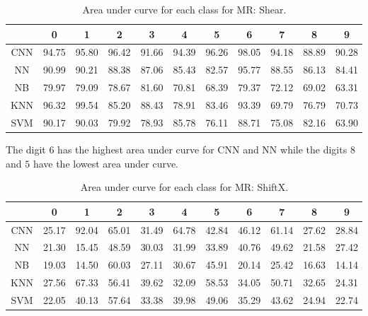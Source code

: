     \begin{table}[H]
    \centering
    \begin{tabular}{|c|c|c|c|c|c|c|c|c|c|c|}
    \hline
    & 0 & 1 & 2 & 3 & 4 & 5 & 6 & 7 & 8 & 9 \\
    \hline
    CNN & 94.75 & 95.80 & 96.42 & 91.66 & 94.39 & 96.26 &\cellcolor{green!25}98.05 & 94.18 & \cellcolor{red!25}88.89 & 90.28  \\ 
    \hline
    NN & 90.99 & 90.21 & 88.38 & 87.06 & 85.43 & \cellcolor{red!25}82.57 & \cellcolor{green!25}95.77 & 88.55 & 86.13 & 84.41 \\
    \hline
    NB & 79.97 & 79.09 & 78.67 & \cellcolor{green!25}81.60 & 70.81 & 68.39 & 79.37 & 72.12 & 69.02 & \cellcolor{red!25}63.31 \\
    \hline
    KNN & 96.32 & \cellcolor{green!25}99.54 & 85.20 & 88.43 & 78.91 & 83.46 & 93.39 & \cellcolor{red!25}69.79 & 76.79 & 70.73 \\
    \hline
    SVM & \cellcolor{green!25}90.17 & 90.03 & 79.92 & 78.93 & 85.78 & 76.11 & 88.71 & 75.08 & 82.16 & \cellcolor{red!25}63.90 \\
    \hline
    \end{tabular}
    \caption{Area under curve for each class for MR: Shear.}
    \label{tbl:test-file-formatShear}
    \end{table}
    The digit $6$ has the highest area under curve for CNN and NN while the digits $8$ and $5$ have the lowest area under curve.
    
    \begin{table}[htb!]
    \centering
    \begin{tabular}{|c|c|c|c|c|c|c|c|c|c|c|}
    \hline
    & 0 & 1 & 2 & 3 & 4 & 5 & 6 & 7 & 8 & 9 \\
    \hline
    CNN & \cellcolor{red!25}25.17 & \cellcolor{green!25}92.04 & 65.01 & 31.49 & 64.78 & 42.84 & 46.12 & 61.14 & 27.62 & 28.84 \\
    \hline
    NN & 21.30 & \cellcolor{red!25}15.45 & 48.59 & 30.03 & 31.99 & 33.89 & 40.76 & \cellcolor{green!25}49.62 & 21.58 & 27.42 \\
    \hline
    NB & 19.03 & 14.50 & \cellcolor{green!25}60.03 & 27.11 & 30.67 & 45.91 & 20.14 & 25.42 & 16.63 & \cellcolor{red!25}14.14 \\
    \hline
    KNN & 27.56 & \cellcolor{green!25}67.33 & 56.41 & 39.62 & 32.09 & 58.53 & 34.05 & 50.71 & 32.65 & \cellcolor{red!25}24.31 \\
    \hline
    SVM & \cellcolor{red!25}22.05 & 40.13 & \cellcolor{green!25}57.64 & 33.38 & 39.98 & 49.06 & 35.29 & 43.62 & 24.94 & 22.74 \\
    \hline
    \end{tabular}
    \caption{Area under curve for each class for MR: ShiftX.}
    \label{tbl:test-file-formatShiftX}
    \end{table}
    
